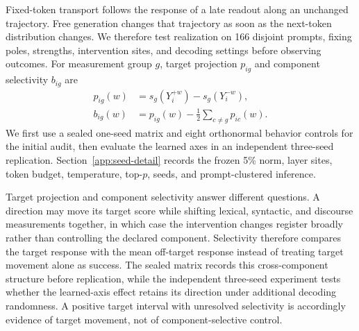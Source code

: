 Fixed-token transport follows the response of a late readout along an unchanged trajectory. Free generation changes that trajectory as soon as the next-token distribution changes. We therefore test realization on 166 disjoint prompts, fixing poles, strengths, intervention sites, and decoding settings before observing outcomes. For measurement group \(g\), target projection \(p_{ig}\) and component selectivity \(b_{ig}\) are
\begin{equation}
\begin{aligned}
p_{ig}(w)&=s_g(Y_i^{+w})-s_g(Y_i^{-w}),\\
b_{ig}(w)&=p_{ig}(w)-\frac{1}{2}\sum_{c\neq g}p_{ic}(w).
\end{aligned}
\label{eq:selectivity}
\end{equation}
We first use a sealed one-seed matrix and eight orthonormal behavior controls for the initial audit, then evaluate the learned axes in an independent three-seed replication. Section~\ref{app:seed-detail} records the frozen 5\% norm, layer sites, token budget, temperature, top-\(p\), seeds, and prompt-clustered inference.

Target projection and component selectivity answer different questions. A direction may move its target score while shifting lexical, syntactic, and discourse measurements together, in which case the intervention changes register broadly rather than controlling the declared component. Selectivity therefore compares the target response with the mean off-target response instead of treating target movement alone as success. The sealed matrix records this cross-component structure before replication, while the independent three-seed experiment tests whether the learned-axis effect retains its direction under additional decoding randomness. A positive target interval with unresolved selectivity is accordingly evidence of target movement, not of component-selective control.


